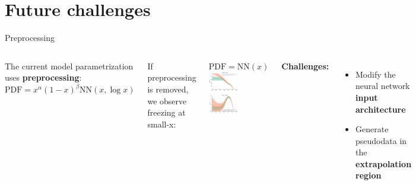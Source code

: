 \documentclass[aspectratio=169,10pt]{beamer}
\begin{document}
\section{Future challenges}

\begin{frame}{Preprocessing}
\begin{columns}[t]

The current model parametrization uses \textbf{preprocessing}:\\
$\mathrm{PDF}=x^\alpha(1-x)^\beta \mathrm{NN}({x,\log x})$

\vspace*{0.2cm}
If preprocessing is removed, we observe freezing at small-x:
\begin{center}
$\mathrm{PDF}= \mathrm{NN}(x)$ \\
\includegraphics[width=0.48\textwidth]{feature_scaling/flatdbar}
\includegraphics[width=0.48\textwidth]{feature_scaling/gluon_saturation}
\end{center}

\textbf{Challenges:}
\begin{itemize}
    \item Modify the {neural network} \\ \textbf{input architecture}
    \item Generate {pseudodata} in the \textbf{extrapolation region}
\end{itemize}

\end{columns}
\end{frame}
\end{document}
